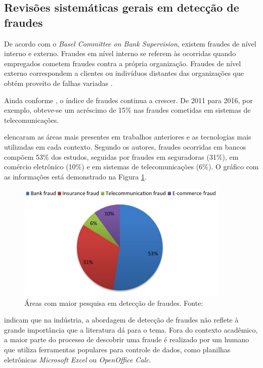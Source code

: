 \documentclass[smallextended]{svjour3}
\begin{document}
\subsection{Revisões sistemáticas gerais em detecção de fraudes}

De acordo com o \emph{Basel Committee on Bank Supervision}, existem fraudes de nível interno e externo. Fraudes em nível interno se referem às ocorridas quando empregados cometem fraudes contra a própria organização. Fraudes de nível externo correspondem a clientes ou indivíduos distantes das organizações que obtém proveito de falhas variadas \citep{Abdallah2016}.

Ainda conforme \cite{Abdallah2016}, o índice de fraudes continua a crescer. De 2011 para 2016, por exemplo, obteve-se um acréscimo de 15\% nas fraudes cometidas em sistemas de telecomunicações.

\cite{Abdallah2016} elencaram as áreas mais presentes em trabalhos anteriores e as tecnologias mais utilizadas em cada contexto. Segundo os autores, fraudes ocorridas em bancos compõem 53\% dos estudos, seguidas por fraudes em seguradoras (31\%), em comércio eletrônico (10\%) e em sistemas de telecomunicações (6\%). O gráfico com as informações está demonstrado na Figura \ref{fig:fraudespopulares}. 

\begin{figure}[!ht]
	\centering
	\includegraphics[width=0.9\textwidth]{imagens/fraudespopulares.jpg}
	\caption{Áreas com maior pesquisa em detecção de fraudes. Fonte: \cite{Abdallah2016}}
	\label{fig:fraudespopulares}
\end{figure}

\cite{Flegel2010} indicam que na indústria, a abordagem de detecção de fraudes não reflete à grande importância que a literatura dá para o tema. Fora do contexto acadêmico, a maior parte do processo de descobrir uma fraude é realizado por um humano que utiliza ferramentas populares para controle de dados, como planilhas eletrônicas \emph{Microsoft Excel} ou \emph{OpenOffice Calc}. 
\end{document}
